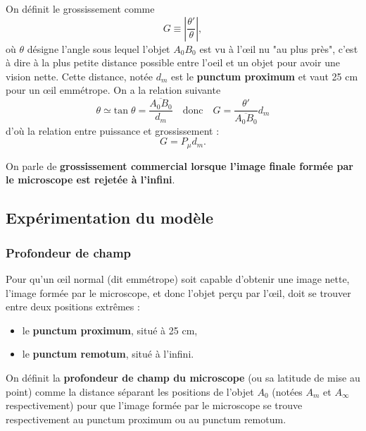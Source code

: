 \documentclass[11pt,a4paper]{report}
\begin{document}
On définit le grossissement comme
\begin{equation}
	\boxed{G \equiv \left|\frac{\theta'}{\theta}\right|},
\end{equation}
où $\theta$ désigne l'angle sous lequel l'objet $A_0B_0$ est vu à l'œil nu "au plus près", c'est à dire à la plus petite distance possible entre l'oeil et un objet pour avoir une vision nette. Cette distance, notée $d_m$ est le \textbf{punctum proximum} et vaut 25 cm pour un œil emmétrope. On a la relation suivante
\begin{equation}
	\theta \simeq \text{tan}\;\theta = \frac{\overline{A_0B_0}}{d_m} \quad\text{donc}\quad
	G = \frac{\theta'}{\overline{A_0B_0}}d_m
\end{equation}
d'où la relation entre puissance et grossissement :
\begin{equation}
	\boxed{G = P_\mu d_m}.
\end{equation}

On parle de \textbf{grossissement commercial lorsque l'image finale formée par le microscope est rejetée à l'infini}.


\subsection{Expérimentation du modèle}

\subsubsection{Profondeur de champ}

Pour qu'un œil normal (dit emmétrope) soit capable d'obtenir une image nette, l'image formée par le microscope, et donc l'objet perçu par l'œil, doit se trouver entre deux positions extrêmes :
\begin{itemize}
	\item le \textbf{punctum proximum}, situé à 25 cm,
	\item le \textbf{punctum remotum}, situé à l'infini.\\
\end{itemize}

On définit la \textbf{profondeur de champ du microscope} (ou sa latitude de mise au point) comme la distance séparant les positions de l'objet $A_0$ (notées $A_m$ et $A_\infty$ respectivement) pour que l'image formée par le microscope se trouve respectivement au punctum proximum ou au punctum remotum.\\
\end{document}
